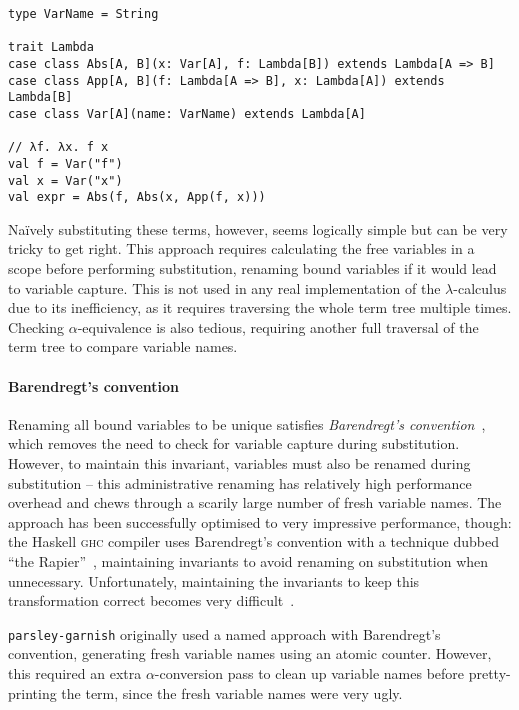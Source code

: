 \documentclass[../../../main.tex]{subfiles}
\begin{document}
\begin{verbatim}
type VarName = String

trait Lambda
case class Abs[A, B](x: Var[A], f: Lambda[B]) extends Lambda[A => B]
case class App[A, B](f: Lambda[A => B], x: Lambda[A]) extends Lambda[B]
case class Var[A](name: VarName) extends Lambda[A]

// λf. λx. f x
val f = Var("f")
val x = Var("x")
val expr = Abs(f, Abs(x, App(f, x)))
\end{verbatim}
%
Naïvely substituting these terms, however, seems logically simple but can be very tricky to get right.
This approach requires calculating the free variables in a scope before performing substitution, renaming bound variables if it would lead to variable capture.
This is not used in any real implementation of the $\lambda$-calculus due to its inefficiency, as it requires traversing the whole term tree multiple times.
Checking $\alpha$-equivalence is also tedious, requiring another full traversal of the term tree to compare variable names.

\paragraph{Barendregt's convention}
Renaming all bound variables to be unique satisfies \emph{Barendregt's convention}~\cite{barendregt_lambda_1984}, which removes the need to check for variable capture during substitution.
However, to maintain this invariant, variables must also be renamed during substitution -- this administrative renaming has relatively high performance overhead and chews through a scarily large number of fresh variable names.
The approach has been successfully optimised to very impressive performance, though:
the Haskell \textsc{ghc} compiler uses Barendregt's convention with a technique dubbed ``the Rapier''~\cite{peytonjones_secrets_2002}, maintaining invariants to avoid renaming on substitution when unnecessary.
Unfortunately, maintaining the invariants to keep this transformation correct becomes very difficult~\cite{maclaurin_thefoil_2023}.

\texttt{parsley-garnish} originally used a named approach with Barendregt's convention, generating fresh variable names using an atomic counter.
However, this required an extra $\alpha$-conversion pass to clean up variable names before pretty-printing the term, since the fresh variable names were very ugly.
\end{document}
